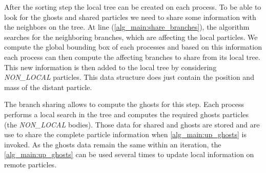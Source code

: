\documentclass[notes.tex]{subfiles}
\begin{document}
After the sorting step the local tree can be created on each process.
To be able to look for the ghosts and shared particles we need to share some
information with the neighbors on the tree.
At line (\ref{alg_main:share_branches}), the algorithm searches for the
neighboring branches, which are affecting the local particles.
We compute the global bounding box of each processes and based on this
information each process can then compute the affecting branches to share from
its local tree.
This new information is then added to the local tree by considering
\textit{NON\_LOCAL} particles.
This data structure does just contain the position and mass of the distant
particle.

The branch sharing allows to compute the ghosts for this step.
Each process performs a local search in the tree and computes the required
ghosts particles (the \textit{NON\_LOCAL} bodies).
Those data for shared and ghosts are stored and are use to share the complete
particle information when \ref{alg_main:up_ghosts} is invoked.
As the ghosts data remain the same within an iteration, the
\ref{alg_main:up_ghosts} can be used several times to update local information
on remote particles.
\end{document}

